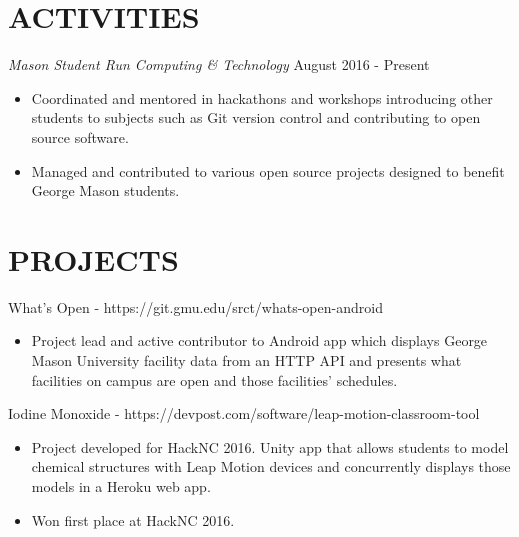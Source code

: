 \documentclass[margin, 10pt]{res} %
\begin{document}
\begin{resume}
 
\section{ACTIVITIES}

{\sl Mason Student Run Computing \& Technology} \hfill August 2016 - Present
\begin{itemize}
\item Coordinated and mentored in hackathons and workshops introducing other students to subjects such as Git version control and contributing to open source software.
\item Managed and contributed to various open source projects designed to benefit George Mason students.
\end{itemize} 




\section{PROJECTS} 

What's Open - https://git.gmu.edu/srct/whats-open-android
\begin{itemize}
\item Project lead and active contributor to Android app which displays George Mason University facility data from an HTTP API and presents what facilities on campus are open and those facilities' schedules.
\end{itemize}

Iodine Monoxide - https://devpost.com/software/leap-motion-classroom-tool
\begin{itemize}
\item Project developed for HackNC 2016. Unity app that allows students to model chemical structures with Leap Motion devices and concurrently displays those models in a Heroku web app.
\item Won first place at HackNC 2016.
\end{itemize}


\end{resume}
\end{document}
